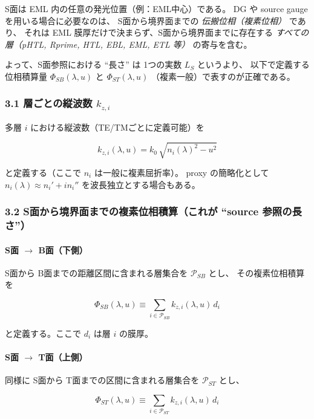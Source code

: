 S面は EML 内の任意の発光位置（例：EML中心）である。
DG や source gauge を用いる場合に必要なのは、
S面から境界面までの \emph{伝搬位相（複素位相）} であり、
それは EML 膜厚だけで決まらず、S面から境界面までに存在する
\emph{すべての層（pHTL, Rprime, HTL, EBL, EML, ETL 等）} の寄与を含む。

よって、S面参照における ``長さ'' は 1つの実数 \(L_S\) というより、
以下で定義する位相積算量 \(\Phi_{SB}(\lambda,u)\) と \(\Phi_{ST}(\lambda,u)\)
（複素一般）で表すのが正確である。

\subsubsection*{3.1 層ごとの縦波数 \(k_{z,i}\)}

多層 \(i\) における縦波数（TE/TMごとに定義可能）を

\begin{equation}
k_{z,i}(\lambda,u) = k_0\,\sqrt{n_i(\lambda)^2 - u^2}
\end{equation}

と定義する（ここで \(n_i\) は一般に複素屈折率）。
proxy の簡略化として \(n_i(\lambda)\approx n_i'+i n_i''\) を波長独立とする場合もある。

\subsubsection*{3.2 S面から境界面までの複素位相積算（これが ``source 参照の長さ''）}

\paragraph{S面 \(\rightarrow\) B面（下側）}
S面から B面までの距離区間に含まれる層集合を \(\mathcal{P}_{SB}\) とし、
その複素位相積算を

\begin{equation}
\boxed{
\Phi_{SB}(\lambda,u) \equiv \sum_{i\in\mathcal{P}_{SB}} k_{z,i}(\lambda,u)\, d_i
}
\end{equation}

と定義する。ここで \(d_i\) は層 \(i\) の膜厚。

\paragraph{S面 \(\rightarrow\) T面（上側）}
同様に S面から T面までの区間に含まれる層集合を \(\mathcal{P}_{ST}\) とし、

\begin{equation}
\boxed{
\Phi_{ST}(\lambda,u) \equiv \sum_{i\in\mathcal{P}_{ST}} k_{z,i}(\lambda,u)\, d_i
}
\end{equation}

